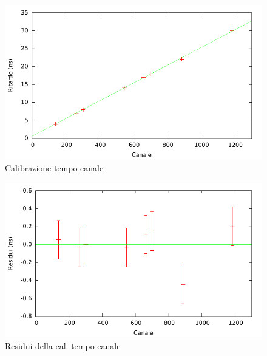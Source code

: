\documentclass[a4paper,11pt,italian]{report}
\begin{document}
\begin{minipage}{\linewidth}
\begin{minipage}{0.45\linewidth}
\centering
\begin{figure}[H]
\includegraphics[width=\columnwidth,keepaspectratio]{../out/chio/Cal_DnDt}
\caption{\small{Calibrazione tempo-canale}}
\end{figure}
\end{minipage}
\hspace{\fill}
\begin{minipage}{0.45\linewidth}
\centering
\begin{figure}[H]
\includegraphics[width=\columnwidth,keepaspectratio]{../out/chio/Residui_cal_DnDt}
\caption{\small{Residui della cal. tempo-canale}}
\end{figure}
\end{minipage}
\end{minipage}
\end{document}
